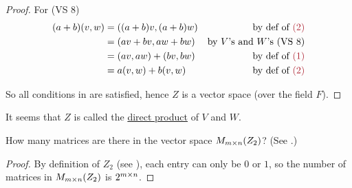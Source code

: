 \begin{proof}
For (VS 8)
\begin{align*}
    (a + b)(v, w) & = ((a + b)v , (a + b)w) & \text{by def of \MAROON{(2)}} \\
                               & = (av + bv, aw + bw) & \text{by \(V\)'s and \(W\)'s (VS 8)} \\
                               & = (av, aw) + (bv, bw) & \text{by def of \MAROON{(1)}} \\
                               & = a(v, w) + b(v, w) & \text{by def of \MAROON{(2)}}
\end{align*}

So all conditions in  are satisfied, hence \(Z\) is a vector space (over the field \(F\)).
\end{proof}

\begin{note}
It seems that \(Z\) is called the \href{https://www.wikiwand.com/en/Direct_product}{direct product} of \(V\) and \(W\).
\end{note}

\begin{exercise} \label{exercise 1.2.22}
How many matrices are there in the vector space \(M_{m \times n}(Z_2)\)? (See .)
\end{exercise}

\begin{proof}
By definition of \(Z_2\) (see ), each entry can only be \(0\) or \(1\), so the number of matrices in \(M_{m \times n}(Z_2)\) is \(2^{m \times n}\).
\end{proof}